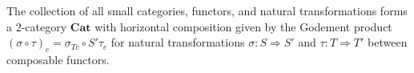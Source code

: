 The collection of all small categories, functors, and natural transformations forms a 2-category $\mathbf{Cat}$ with horizontal composition given by the Godement product $(\sigma \circ \tau)_c = \sigma_{Tc} \circ S'\tau_c$ for natural transformations $\sigma: S \Rightarrow S'$ and $\tau: T \Rightarrow T'$ between composable functors.
